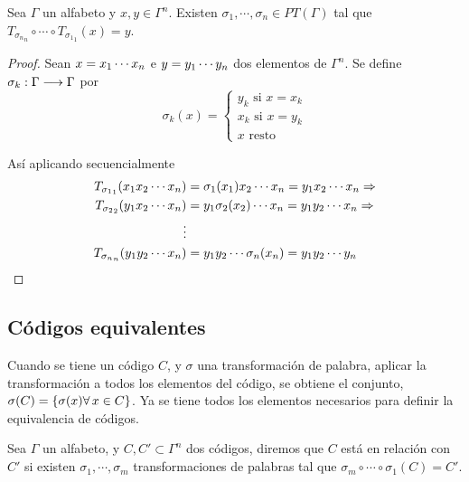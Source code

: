 \begin{lemma}
	\label{res:palabra-transforma-cero}
	Sea $\Gamma$ un alfabeto y $x,y\in\Gamma^n$.
	Existen $\sigma_1,\cdots,\sigma_n\in PT(\Gamma)$ tal que $T_{{\sigma_n}_n}\circ\cdots\circ T_{{\sigma_1}_1}(x)=y$.
\end{lemma}
\begin{proof}
	Sean $x=x_1\cdots x_{n}$ e  $y=y_1\cdots y_{n}$ dos elementos de $\Gamma^n$.
	Se define $\sigma_k:\Gamma\longrightarrow \Gamma$ por
	\[\sigma_k(x)=\begin{cases}
		              y_k \text{ si } x = x_k\\
		              x_k \text{ si } x = y_k\\
		              x \text{ resto }
	\end{cases}
	\]

	Así aplicando secuencialmente
	\begin{align*}
		T_{{\sigma_1}_1}(x_1 x_2\cdots x_n)&=\sigma_1(x_1)x_2\cdots x_n=y_1 x_2\cdots x_n\Rightarrow\\
		T_{{\sigma_2}_2}(y_1 x_2\cdots x_n)&=y_1\sigma_2(x_2)\cdots x_n=y_1 y_2\cdots x_n\Rightarrow\\
		\vdots & \\
		T_{{\sigma_n}_n}(y_1 y_2\cdots x_n)&=y_1 y_2\cdots\sigma_n(x_n)=y_1 y_2\cdots y_n
	\end{align*}
\end{proof}

\subsection{Códigos equivalentes}
Cuando se tiene un código $C$, y $\sigma$ una transformación de palabra, aplicar la transformación a todos los elementos del código, se obtiene el conjunto, $\sigma(C)=\set{\sigma(x) \forall x\in C}$.
Ya se tiene todos los elementos necesarios para definir la equivalencia de códigos.
\begin{definition}
	Sea $\Gamma$ un alfabeto, y $C,C'\subset \Gamma^n$ dos códigos, diremos que $C$ está en relación con $C'$ si existen $\sigma_1,\cdots,\sigma_m$ transformaciones de palabras tal que $\sigma_m\circ\cdots\circ \sigma_1(C)= C'$.
\end{definition}

